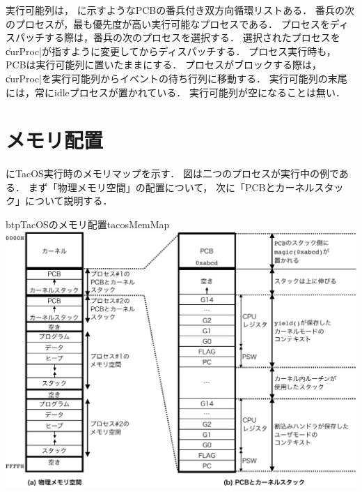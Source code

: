 実行可能列は，
に示すようなPCBの番兵付き双方向循環リストある．
番兵の次のプロセスが，最も優先度が高い実行可能なプロセスである．
プロセスをディスパッチする際は，番兵の次のプロセスを選択する．
選択されたプロセスを\|curProc|が指すように変更してからディスパッチする．
プロセス実行時も，PCBは実行可能列に置いたままにする．
プロセスがブロックする際は，
\|curProc|を実行可能列からイベントの待ち行列に移動する．
実行可能列の末尾には，常にidleプロセスが置かれている．
実行可能列が空になることは無い．

\section{メモリ配置}
にTacOS実行時のメモリマップを示す．
図は二つのプロセスが実行中の例である．
まず「物理メモリ空間」の配置について，
次に「PCBとカーネルスタック」について説明する．

\begin{myfig}{btp}{TacOSのメモリ配置}{tacosMemMap}
  \includegraphics[scale=0.6]{Fig/tacosMemMap-crop.pdf}
\end{myfig}

